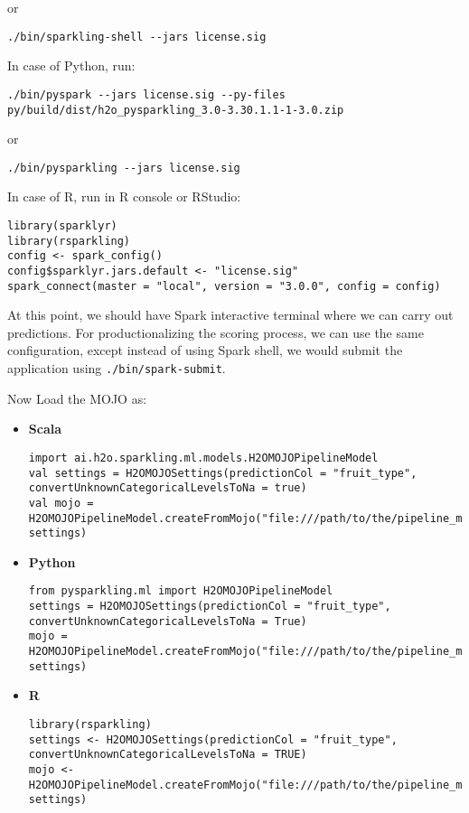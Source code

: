 or

\begin{lstlisting}[style=Bash]
./bin/sparkling-shell --jars license.sig
\end{lstlisting}

In case of Python, run:

\begin{lstlisting}[style=Bash]
./bin/pyspark --jars license.sig --py-files py/build/dist/h2o_pysparkling_3.0-3.30.1.1-1-3.0.zip
\end{lstlisting}

or

\begin{lstlisting}[style=Bash]
./bin/pysparkling --jars license.sig
\end{lstlisting}

In case of R, run in R console or RStudio:

\begin{lstlisting}[style=R]
library(sparklyr)
library(rsparkling)
config <- spark_config()
config$sparklyr.jars.default <- "license.sig"
spark_connect(master = "local", version = "3.0.0", config = config)
\end{lstlisting}


At this point, we should have Spark interactive terminal where we can carry out predictions.
For productionalizing the scoring process, we can use the same configuration,
except instead of using Spark shell, we would submit the application using \texttt{./bin/spark-submit}.

Now Load the MOJO as:

\begin{itemize}
    \item \textbf{Scala} \begin{lstlisting}[style=Scala]
import ai.h2o.sparkling.ml.models.H2OMOJOPipelineModel
val settings = H2OMOJOSettings(predictionCol = "fruit_type", convertUnknownCategoricalLevelsToNa = true)
val mojo = H2OMOJOPipelineModel.createFromMojo("file:///path/to/the/pipeline_mojo.zip", settings)
    \end{lstlisting}
    \item \textbf{Python} \begin{lstlisting}[style=Python]
from pysparkling.ml import H2OMOJOPipelineModel
settings = H2OMOJOSettings(predictionCol = "fruit_type", convertUnknownCategoricalLevelsToNa = True)
mojo = H2OMOJOPipelineModel.createFromMojo("file:///path/to/the/pipeline_mojo.zip", settings)
    \end{lstlisting}
    \item \textbf{R} \begin{lstlisting}[style=R]
library(rsparkling)
settings <- H2OMOJOSettings(predictionCol = "fruit_type", convertUnknownCategoricalLevelsToNa = TRUE)
mojo <- H2OMOJOPipelineModel.createFromMojo("file:///path/to/the/pipeline_mojo.zip", settings)
    \end{lstlisting}
\end{itemize}

